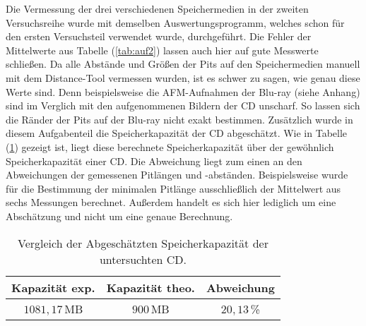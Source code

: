 \bigskip
Die Vermessung der drei verschiedenen Speichermedien in der zweiten Versuchsreihe wurde mit demselben Auswertungsprogramm, welches schon f\"ur den ersten Versuchsteil verwendet wurde, durchgef\"uhrt.
Die Fehler der Mittelwerte aus Tabelle (\ref{tab:auf2}) lassen auch hier auf gute Messwerte schlie{\ss}en.
Da alle Abst\"ande und Gr\"o{\ss}en der Pits auf den Speichermedien manuell mit dem Distance-Tool vermessen wurden, ist es schwer zu sagen, wie genau diese Werte sind.
Denn beispielsweise die AFM-Aufnahmen der Blu-ray (siehe Anhang) sind im Verglich mit den aufgenommenen Bildern der CD unscharf.
So lassen sich die R\"ander der Pits auf der Blu-ray nicht exakt bestimmen.
Zus\"atzlich wurde in diesem Aufgabenteil die Speicherkapazit\"at der CD abgesch\"atzt.
Wie in Tabelle (\ref{tab:auf2_disk}) gezeigt ist, liegt diese berechnete Speicherkapazit\"at \"uber der gew\"ohnlich Speicherkapazit\"at einer CD.
Die Abweichung liegt zum einen an den Abweichungen der gemessenen Pitl\"angen und -abst\"anden.
Beispielsweise wurde f\"ur die Bestimmung der minimalen Pitl\"ange ausschlie{\ss}lich der Mittelwert aus sechs Messungen berechnet.
Au{\ss}erdem handelt es sich hier lediglich um eine Absch\"atzung und nicht um eine genaue Berechnung.
\begin{table}
	\centering
	\caption{Vergleich der Abgesch\"atzten Speicherkapazit\"at der untersuchten CD.}
\begin{tabular}{|ccc|}
	\hline
	{Kapazit\"at exp.} & {Kapazit\"at theo. \citep{CD_kapa}} & {Abweichung} \\
	\hline
	$1081,17 \,$MB & $900 \,$MB & $20,13 \,$\% \\
	\hline
\end{tabular}
\label{tab:auf2_disk}
\end{table}

